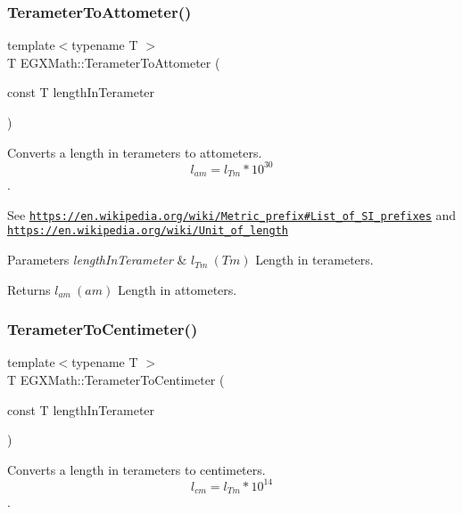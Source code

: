 \subsubsection{\texorpdfstring{Terameter\+To\+Attometer()}{TerameterToAttometer()}}
{\footnotesize\ttfamily template$<$typename T $>$ \\
T E\+G\+X\+Math\+::\+Terameter\+To\+Attometer (\begin{DoxyParamCaption}\item[{const T}]{length\+In\+Terameter }\end{DoxyParamCaption})}



Converts a length in terameters to attometers. \[ l_{am}=l_{Tm} * 10^{30} \]. 

See \href{https://en.wikipedia.org/wiki/Metric_prefix#List_of_SI_prefixes}{\tt https\+://en.\+wikipedia.\+org/wiki/\+Metric\+\_\+prefix\#\+List\+\_\+of\+\_\+\+S\+I\+\_\+prefixes} and \href{https://en.wikipedia.org/wiki/Unit_of_length}{\tt https\+://en.\+wikipedia.\+org/wiki/\+Unit\+\_\+of\+\_\+length} 
\begin{DoxyParams}{Parameters}
{\em length\+In\+Terameter} & $ l_{Tm}\ (Tm)$ Length in terameters. \\
\hline
\end{DoxyParams}
\begin{DoxyReturn}{Returns}
$ l_{am}\ (am)$ Length in attometers. 
\end{DoxyReturn}
\mbox{\label{group___e_g_x_math-_conversions-_length_conversions-_terameter-_s_i_gad280a7bb7ff83217a496db8168c27ee9}} 
\subsubsection{\texorpdfstring{Terameter\+To\+Centimeter()}{TerameterToCentimeter()}}
{\footnotesize\ttfamily template$<$typename T $>$ \\
T E\+G\+X\+Math\+::\+Terameter\+To\+Centimeter (\begin{DoxyParamCaption}\item[{const T}]{length\+In\+Terameter }\end{DoxyParamCaption})}



Converts a length in terameters to centimeters. \[ l_{cm}=l_{Tm} * 10^{14} \]. 


